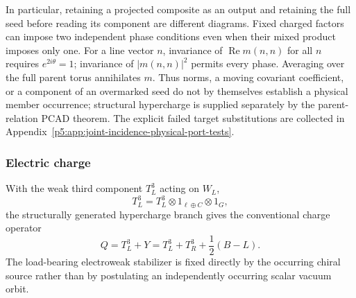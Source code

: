 \documentclass[12pt,a4paper]{article}
\begin{document}
In particular, retaining a projected composite as an output and
retaining the full seed before reading its component are different
diagrams.  Fixed charged factors can impose two independent phase
conditions even when their mixed product imposes only one.
For a line vector \(n\), invariance of
\(\operatorname{Re}m(n,n)\) for all \(n\) requires
\(e^{2i\theta}=1\); invariance of \(|m(n,n)|^2\) permits every
phase.  Averaging over the full parent torus annihilates \(m\).
Thus norms, a moving covariant coefficient, or a component of an
overmarked seed do not by themselves establish a physical member occurrence; structural hypercharge is supplied separately by the parent-relation PCAD theorem.
The explicit failed target substitutions are collected in
Appendix~\ref{p5:app:joint-incidence-physical-port-tests}.


\subsubsection{Electric charge}
\label{p5:sec:part1-electric-charge}

With the weak third component \(T_L^3\) acting on \(W_L\),
\[
T_L^3=T_L^3\otimes 1_{\ell\oplus C}\otimes 1_G,
\]
the structurally generated hypercharge branch gives the conventional charge
operator
\begin{equation}
\label{p5:eq:part1-Q}
\boxed{Q=T_L^3+Y=T_L^3+T_R^3+\frac12(B-L).}
\end{equation}
The load-bearing electroweak stabilizer is fixed directly by the occurring
chiral source rather than by postulating an independently occurring scalar
vacuum orbit.
\end{document}
